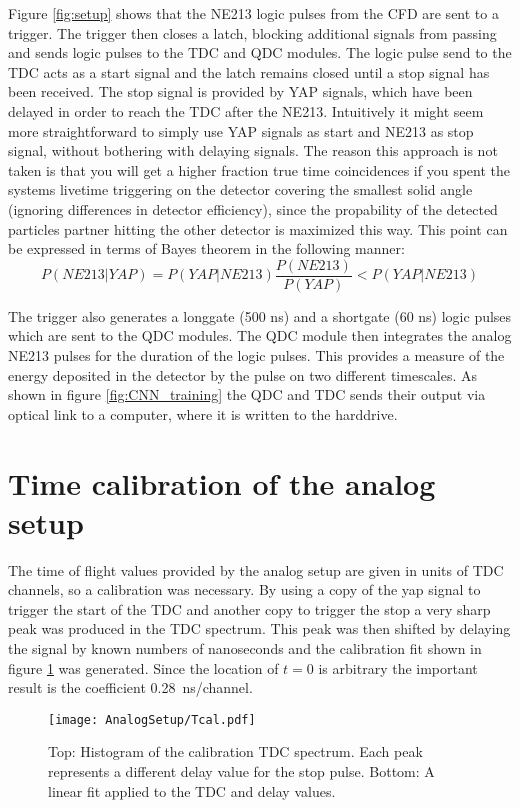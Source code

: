 \documentclass[main.tex]{subfiles}
\begin{document}
Figure \ref{fig:setup} shows that the NE213 logic pulses from the CFD are sent to a trigger. The trigger then closes a latch, blocking additional signals from passing and sends logic pulses to the TDC and QDC modules. The logic pulse send to the TDC acts as a start signal and the latch remains closed until a stop signal has been received. The stop signal is provided by YAP signals, which have been delayed in order to reach the TDC after the NE213. Intuitively it might seem more straightforward to simply use YAP signals as start and NE213 as stop signal, without bothering with delaying signals. The reason this approach is not taken is that you will get a higher fraction true time coincidences if you spent the systems livetime triggering on the detector covering the smallest solid angle (ignoring differences in detector efficiency), since the propability of the detected particles partner hitting the other detector is maximized this way. This point can be expressed in terms of Bayes theorem in the following manner:
$$P(NE213|YAP) = P(YAP|NE213) \frac{P(NE213)}{P(YAP)} < P(YAP|NE213)$$ 

The trigger also generates a longgate (500 ns) and a shortgate (60 ns) logic pulses which are sent to the QDC modules. The QDC module then integrates the analog NE213 pulses for the duration of the logic pulses. This provides a measure of the energy deposited in the detector by the pulse on two different timescales. As shown in figure \ref{fig:CNN_training} the QDC and TDC sends their output via optical link to a computer, where it is written to the harddrive.

\section{Time calibration of the analog setup}\label{sec:timecal}
The time of flight values provided by the analog setup are given in units of TDC channels, so a calibration was necessary. By using a copy of the yap signal to trigger the start of the TDC and another copy to trigger the stop a very sharp peak was produced in the TDC spectrum.
This peak was then shifted by delaying the signal by known numbers of nanoseconds and the calibration fit shown in figure \ref{fig:Tcal} was generated. Since the location of $t=0$ is arbitrary the important result is the coefficient \SI{0.28}{\nano\second/channel}.
\begin{figure}[ht]
	\centering
    	\texttt{[image: AnalogSetup/Tcal.pdf]}
        \caption[TDC calibration of analog setup]{Top: Histogram of the calibration TDC spectrum. Each peak represents a different delay value for the stop pulse. Bottom: A linear fit applied to the TDC and delay values.}
	    \label{fig:Tcal} 
\end{figure}
\end{document}
